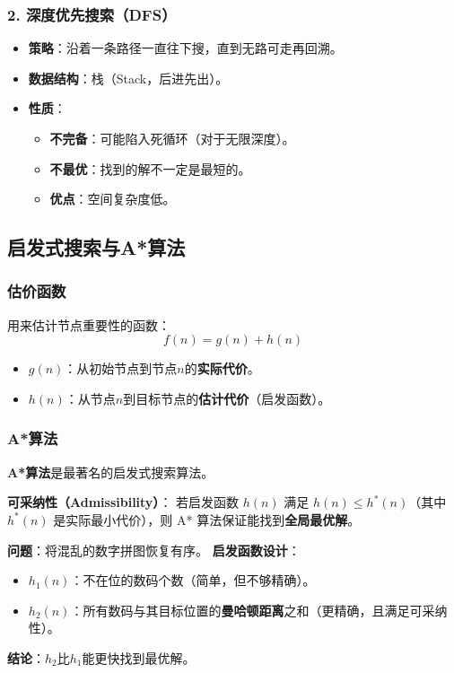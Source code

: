 \subsubsection{2. 深度优先搜索（DFS）}
\begin{itemize}[leftmargin=2em,itemsep=0pt]
    \item \textbf{策略}：沿着一条路径一直往下搜，直到无路可走再回溯。
    \item \textbf{数据结构}：栈（Stack，后进先出）。
    \item \textbf{性质}：
    \begin{itemize}
        \item \textbf{不完备}：可能陷入死循环（对于无限深度）。
        \item \textbf{不最优}：找到的解不一定是最短的。
        \item \textbf{优点}：空间复杂度低。
    \end{itemize}
\end{itemize}

\subsection{启发式搜索与A*算法}

\subsubsection{估价函数}
用来估计节点重要性的函数：
$$f(n) = g(n) + h(n)$$
\begin{itemize}[leftmargin=2em,itemsep=0pt]
    \item $g(n)$：从初始节点到节点$n$的\textbf{实际代价}。
    \item $h(n)$：从节点$n$到目标节点的\textbf{估计代价}（启发函数）。
\end{itemize}

\subsubsection{A*算法}
\textbf{A*算法}是最著名的启发式搜索算法。
\begin{conceptbox}
\textbf{可采纳性（Admissibility）}：
若启发函数 $h(n)$ 满足 $h(n) \le h^*(n)$（其中 $h^*(n)$ 是实际最小代价），则 A* 算法保证能找到\textbf{全局最优解}。
\end{conceptbox}

\begin{examplebox}[例题4.1 八数码问题的A*求解]
\textbf{问题}：将混乱的数字拼图恢复有序。
\textbf{启发函数设计}：
\begin{itemize}[itemsep=0pt]
    \item $h_1(n)$：不在位的数码个数（简单，但不够精确）。
    \item $h_2(n)$：所有数码与其目标位置的\textbf{曼哈顿距离}之和（更精确，且满足可采纳性）。
\end{itemize}
\textbf{结论}：$h_2$比$h_1$能更快找到最优解。
\end{examplebox}

